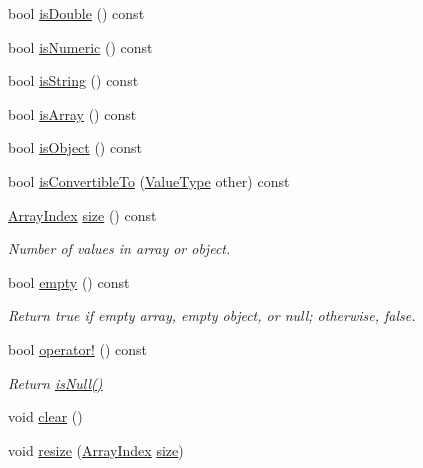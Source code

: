 \begin{DoxyCompactItemize}
\item 
bool \hyperlink{class_json_1_1_value_a4a2e2a790e19a1c09fc5dd12d7ad47b5}{is\+Double} () const
\item 
bool \hyperlink{class_json_1_1_value_af961a000cd203c895e44c195ab39b866}{is\+Numeric} () const
\item 
bool \hyperlink{class_json_1_1_value_a71e1f82cf1c3eaf969d400dcffb163a6}{is\+String} () const
\item 
bool \hyperlink{class_json_1_1_value_a1627eb9d6568d6d0252fa8bb711c0a59}{is\+Array} () const
\item 
bool \hyperlink{class_json_1_1_value_a8cf96c0f2a552051fcfc78ffee60e037}{is\+Object} () const
\item 
bool \hyperlink{class_json_1_1_value_af1ee6be27a96a7d12128efdd60deb54d}{is\+Convertible\+To} (\hyperlink{namespace_json_a7d654b75c16a57007925868e38212b4e}{Value\+Type} other) const
\item 
\hyperlink{class_json_1_1_value_a184a91566cccca7b819240f0d5561c7d}{Array\+Index} \hyperlink{class_json_1_1_value_a0ec2808e1d7efa4e9fad938d6667be44}{size} () const
\begin{DoxyCompactList}\small\item\em Number of values in array or object. \end{DoxyCompactList}\item 
bool \hyperlink{class_json_1_1_value_a0519a551e37ee6665d74742b3f96bab3}{empty} () const
\begin{DoxyCompactList}\small\item\em Return true if empty array, empty object, or null; otherwise, false. \end{DoxyCompactList}\item 
bool \hyperlink{class_json_1_1_value_a731b89fb4764c39ce2328e1707c822b9}{operator!} () const
\begin{DoxyCompactList}\small\item\em Return \hyperlink{class_json_1_1_value_abde4070e21e46dc4f8203f66582cb19f}{is\+Null()} \end{DoxyCompactList}\item 
void \hyperlink{class_json_1_1_value_a501a4d67e6c875255c2ecc03ccd2019b}{clear} ()
\item 
void \hyperlink{class_json_1_1_value_aa284353271ada427dbfa04a42f2be407}{resize} (\hyperlink{class_json_1_1_value_a184a91566cccca7b819240f0d5561c7d}{Array\+Index} \hyperlink{class_json_1_1_value_a0ec2808e1d7efa4e9fad938d6667be44}{size})
\item 

\end{DoxyCompactItemize}
